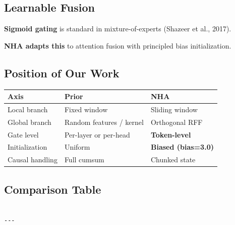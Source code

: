 \subsection{Learnable Fusion}

\textbf{Sigmoid gating} is standard in mixture-of-experts (Shazeer et al., 2017).

\textbf{NHA adapts this} to attention fusion with principled bias initialization.

\subsection{Position of Our Work}

\begin{table}[H]
\centering
\small
\begin{tabular}{lll}
\toprule
\textbf{Axis} & \textbf{Prior} & \textbf{NHA} \\
\midrule
Local branch & Fixed window & Sliding window \\
Global branch & Random features / kernel & Orthogonal RFF \\
Gate level & Per-layer or per-head & \textbf{Token-level} \\
Initialization & Uniform & \textbf{Biased (bias=3.0)} \\
Causal handling & Full cumsum & Chunked state \\
\bottomrule
\end{tabular}
\end{table}

\subsection{Comparison Table}

\begin{lstlisting}

---
\end{lstlisting}